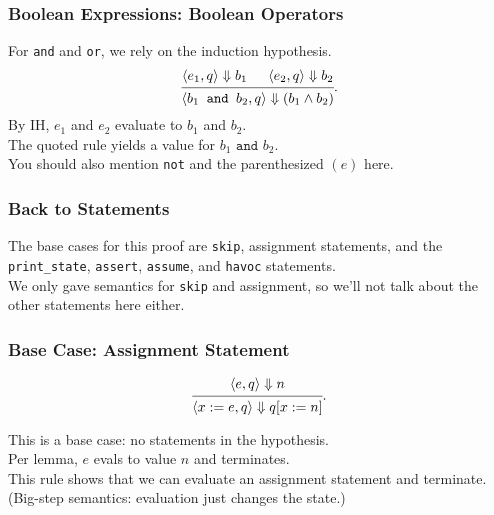 \documentclass{beamer}
\newenvironment{changemargin}[1]{%
  \begin{list}{}{%
    \setlength{\topsep}{0pt}%
    \setlength{\leftmargin}{#1}%
    \setlength{\rightmargin}{1em}
    \setlength{\listparindent}{\parindent}%
    \setlength{\itemindent}{\parindent}%
    \setlength{\parsep}{\parskip}%
  }%
  \item[]}{\end{list}}
\begin{document}
\begin{frame}
  \frametitle{Boolean Expressions: Boolean Operators}
  \Large
  \begin{changemargin}{2em}
    For \texttt{and} and \texttt{or}, we rely on the induction hypothesis.
\[
  \begin{prooftree}
    \hypo{\langle e_1, q \rangle \Downarrow b_1}
    \hypo{\langle e_2, q \rangle \Downarrow b_2}
  \infer2{\langle b_1 \texttt{~and~} b_2, q \rangle \Downarrow (b_1 \wedge b_2)}
  \end{prooftree}
  .
\]
By IH, $e_1$ and $e_2$ evaluate to $b_1$ and $b_2$.\\
The quoted rule
yields a value for $b_1 \texttt{~and~} b_2$.\\[1em]

You should also mention \texttt{not} and the parenthesized $(e)$ here.~~\qedsymbol
  \end{changemargin}
\end{frame}

\begin{frame}
  \frametitle{Back to Statements}
  \Large
  \begin{changemargin}{2em}
The base cases for this proof are \texttt{skip}, assignment statements, and the \texttt{print\_state},
\texttt{assert}, \texttt{assume}, and \texttt{havoc} statements. \\[1em]
We only gave semantics for \texttt{skip} and
assignment, so we'll not talk about the other statements here either.
  \end{changemargin}
\end{frame}

\begin{frame}
  \frametitle{Base Case: Assignment Statement}
  \Large
  \begin{changemargin}{2em}
\[
  \begin{prooftree}
    \hypo{\langle e, q \rangle \Downarrow n}
  \infer1{\langle x := e, q \rangle \Downarrow q[x:=n]}
  \end{prooftree}
  .
\]

This is a base case: no statements in the hypothesis.\\[1em]

Per lemma, $e$ evals to value $n$ and terminates. \\[1em]

This rule shows that we can evaluate an
assignment statement and terminate. \\
(Big-step semantics: evaluation just changes the state.)
  \end{changemargin}
\end{frame}
\end{document}
